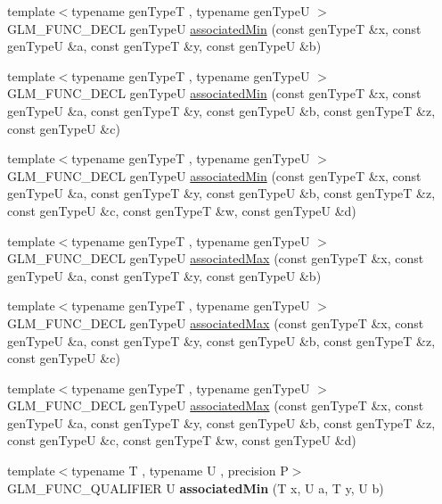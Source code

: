 \begin{DoxyCompactItemize}
\item 
{\footnotesize template$<$typename gen\+TypeT , typename gen\+TypeU $>$ }\\G\+L\+M\+\_\+\+F\+U\+N\+C\+\_\+\+D\+E\+CL gen\+TypeU \hyperlink{group__gtx__associated__min__max_ga47bdb60409768f3d315bc5a1f739810a}{associated\+Min} (const gen\+TypeT \&x, const gen\+TypeU \&a, const gen\+TypeT \&y, const gen\+TypeU \&b)
\item 
{\footnotesize template$<$typename gen\+TypeT , typename gen\+TypeU $>$ }\\G\+L\+M\+\_\+\+F\+U\+N\+C\+\_\+\+D\+E\+CL gen\+TypeU \hyperlink{group__gtx__associated__min__max_ga3f696c0cce55211f333edb7336cc9cb8}{associated\+Min} (const gen\+TypeT \&x, const gen\+TypeU \&a, const gen\+TypeT \&y, const gen\+TypeU \&b, const gen\+TypeT \&z, const gen\+TypeU \&c)
\item 
{\footnotesize template$<$typename gen\+TypeT , typename gen\+TypeU $>$ }\\G\+L\+M\+\_\+\+F\+U\+N\+C\+\_\+\+D\+E\+CL gen\+TypeU \hyperlink{group__gtx__associated__min__max_ga45618e13844d00046a0fe3409ae7513e}{associated\+Min} (const gen\+TypeT \&x, const gen\+TypeU \&a, const gen\+TypeT \&y, const gen\+TypeU \&b, const gen\+TypeT \&z, const gen\+TypeU \&c, const gen\+TypeT \&w, const gen\+TypeU \&d)
\item 
{\footnotesize template$<$typename gen\+TypeT , typename gen\+TypeU $>$ }\\G\+L\+M\+\_\+\+F\+U\+N\+C\+\_\+\+D\+E\+CL gen\+TypeU \hyperlink{group__gtx__associated__min__max_gaee554495240b93d80492b3d2312ede1d}{associated\+Max} (const gen\+TypeT \&x, const gen\+TypeU \&a, const gen\+TypeT \&y, const gen\+TypeU \&b)
\item 
{\footnotesize template$<$typename gen\+TypeT , typename gen\+TypeU $>$ }\\G\+L\+M\+\_\+\+F\+U\+N\+C\+\_\+\+D\+E\+CL gen\+TypeU \hyperlink{group__gtx__associated__min__max_ga20218dcc769c76adf0c3e9aad21c64a4}{associated\+Max} (const gen\+TypeT \&x, const gen\+TypeU \&a, const gen\+TypeT \&y, const gen\+TypeU \&b, const gen\+TypeT \&z, const gen\+TypeU \&c)
\item 
{\footnotesize template$<$typename gen\+TypeT , typename gen\+TypeU $>$ }\\G\+L\+M\+\_\+\+F\+U\+N\+C\+\_\+\+D\+E\+CL gen\+TypeU \hyperlink{group__gtx__associated__min__max_ga23f2bce9c1d6f775cd1f7bf36525286e}{associated\+Max} (const gen\+TypeT \&x, const gen\+TypeU \&a, const gen\+TypeT \&y, const gen\+TypeU \&b, const gen\+TypeT \&z, const gen\+TypeU \&c, const gen\+TypeT \&w, const gen\+TypeU \&d)
\item 
{\footnotesize template$<$typename T , typename U , precision P$>$ }\\G\+L\+M\+\_\+\+F\+U\+N\+C\+\_\+\+Q\+U\+A\+L\+I\+F\+I\+ER U {\bfseries associated\+Min} (T x, U a, T y, U b)\hypertarget{namespaceglm_a8234240191a8aaecdf085f19d41abc5e}{}\label{namespaceglm_a8234240191a8aaecdf085f19d41abc5e}


\end{DoxyCompactItemize}
